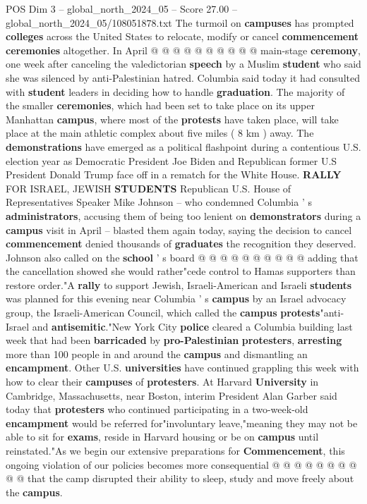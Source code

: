 \begin{textsample}{POS Dim 3 – global\_north\_2024\_05 – Score 27.00 – global\_north\_2024\_05/108051878.txt}
The turmoil on \textbf{campuses} has prompted \textbf{colleges} across the United States to relocate, modify or cancel \textbf{commencement} \textbf{ceremonies} altogether.
In April @ @ @ @ @ @ @ @ @ @ main-stage \textbf{ceremony}, one week after canceling the valedictorian \textbf{speech} by a Muslim \textbf{student} who said she was silenced by anti-Palestinian hatred.
Columbia said today it had consulted with \textbf{student} leaders in deciding how to handle \textbf{graduation}.
The majority of the smaller \textbf{ceremonies}, which had been set to take place on its upper Manhattan \textbf{campus}, where most of the \textbf{protests} have taken place, will take place at the main athletic complex about five miles ( 8 km ) away.
The \textbf{demonstrations} have emerged as a political flashpoint during a contentious U.S. election year as Democratic President Joe Biden and Republican former U.S President Donald Trump face off in a rematch for the White House. \textbf{RALLY} FOR ISRAEL, JEWISH \textbf{STUDENTS} Republican U.S.
House of Representatives Speaker Mike Johnson -- who condemned Columbia ' s \textbf{administrators}, accusing them of being too lenient on \textbf{demonstrators} during a \textbf{campus} visit in April -- blasted them again today, saying the decision to cancel \textbf{commencement} denied thousands of \textbf{graduates} the recognition they deserved.
Johnson also called on the \textbf{school} ' s board @ @ @ @ @ @ @ @ @ @ adding that the cancellation showed she would rather"cede control to Hamas supporters than restore order."A \textbf{rally} to support Jewish, Israeli-American and Israeli \textbf{students} was planned for this evening near Columbia ' s \textbf{campus} by an Israel advocacy group, the Israeli-American Council, which called the \textbf{campus} \textbf{protests}"anti-Israel and \textbf{antisemitic}."New York City \textbf{police} cleared a Columbia building last week that had been \textbf{barricaded} by \textbf{pro-Palestinian} \textbf{protesters}, \textbf{arresting} more than 100 people in and around the \textbf{campus} and dismantling an \textbf{encampment}.
Other U.S. \textbf{universities} have continued grappling this week with how to clear their \textbf{campuses} of \textbf{protesters}.
At Harvard \textbf{University} in Cambridge, Massachusetts, near Boston, interim President Alan Garber said today that \textbf{protesters} who continued participating in a two-week-old \textbf{encampment} would be referred for"involuntary leave,"meaning they may not be able to sit for \textbf{exams}, reside in Harvard housing or be on \textbf{campus} until reinstated."As we begin our extensive preparations for \textbf{Commencement}, this ongoing violation of our policies becomes more consequential @ @ @ @ @ @ @ @ @ @ that the camp disrupted their ability to sleep, study and move freely about the \textbf{campus}.

\end{textsample}
